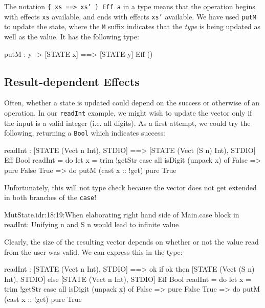 \noindent
The notation \texttt{\{ xs ==> xs' \} Eff a} in a type means that the
operation begins with effects \texttt{xs} available, and ends with effects
\texttt{xs'} available. We have used \texttt{putM} to update the state, where
the \texttt{M} suffix indicates that the \emph{type} is being updated as well
as the value. It has the following type:

\begin{code}
putM : y -> { [STATE x] ==> [STATE y] } Eff () 
\end{code}

\subsection{Result-dependent Effects}

Often, whether a state is updated could depend on the success or otherwise
of an operation. In our \texttt{readInt} example, we might wish to update
the vector only if the input is a valid integer (i.e. all digits). As a
first attempt, we could try the following, returning a \texttt{Bool} which
indicates success:

\begin{code}
readInt : { [STATE (Vect n Int), STDIO] ==>
            [STATE (Vect (S n) Int), STDIO] } Eff Bool
readInt = do let x = trim !getStr
             case all isDigit (unpack x) of
                  False => pure False
                  True => do putM (cast x :: !get)
                             pure True
\end{code}

\noindent
Unfortunately, this will not type check because the vector does not get
extended in both branches of the \texttt{case}!

\begin{code}
MutState.idr:18:19:When elaborating right hand side of Main.case 
block in readInt:
Unifying n and S n would lead to infinite value
\end{code}

\noindent
Clearly, the size of the resulting vector depends on whether or not the
value read from the user was valid. We can express this in the type:

\begin{code}
readInt : { [STATE (Vect n Int), STDIO] ==>
            {ok} if ok then [STATE (Vect (S n) Int), STDIO]
                       else [STATE (Vect n Int), STDIO] } Eff Bool
readInt = do let x = trim !getStr
             case all isDigit (unpack x) of
                  False => pure False 
                  True => do putM (cast x :: !get)
                             pure True 
\end{code}

